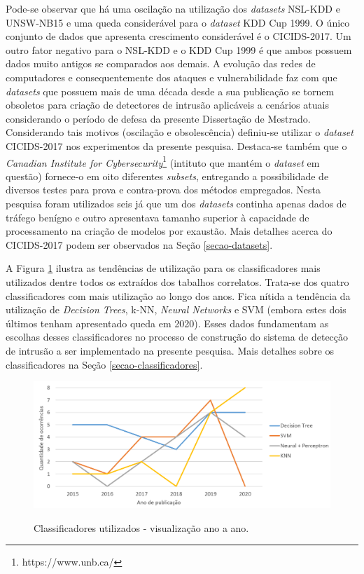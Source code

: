 Pode-se observar que há uma oscilação na utilização dos \textit{datasets} NSL-KDD e UNSW-NB15 e uma queda considerável para o \textit{dataset} KDD Cup 1999. O único conjunto de dados que apresenta crescimento considerável é o CICIDS-2017. Um outro fator negativo para o NSL-KDD e o KDD Cup 1999 é que ambos possuem dados muito antigos se comparados aos demais. A evolução das redes de computadores e consequentemente dos ataques e vulnerabilidade faz com que \textit{datasets} que possuem mais de uma década desde a sua publicação se tornem obsoletos para criação de detectores de intrusão aplicáveis a cenários atuais considerando o período de defesa da presente Dissertação de Mestrado. Considerando tais motivos (oscilação e obsolescência) definiu-se utilizar o \textit{dataset} CICIDS-2017 nos experimentos da presente pesquisa. Destaca-se também que o \textit{Canadian Institute for Cybersecurity}\footnote{https://www.unb.ca/} (intituto que mantém o \textit{dataset} em questão) fornece-o em oito diferentes \textit{subsets}, entregando a possibilidade de diversos testes para prova e contra-prova dos métodos empregados. Nesta pesquisa foram utilizados seis já que um dos \textit{datasets} continha apenas dados de tráfego benígno e outro apresentava tamanho superior à capacidade de processamento na criação de modelos por exaustão. Mais detalhes acerca do CICIDS-2017 podem ser observados na Seção \ref{secao-datasets}.


A Figura \ref{fig:tend_class} ilustra as tendências de utilização para os classificadores mais utilizados dentre todos os extraídos dos tabalhos correlatos. Trata-se dos quatro classificadores com mais utilização ao longo dos anos. Fica nítida a tendência da utilização de \textit{Decision Trees}, k-NN, \textit{Neural Networks} e SVM (embora estes dois últimos tenham apresentado queda em 2020). Esses dados fundamentam as escolhas desses classificadores no processo de construção do sistema de detecção de intrusão a ser implementado na presente pesquisa. Mais detalhes sobre os classificadores na Seção \ref{secao-classificadores}.

\begin{figure}[H]
\centering
\caption{Classificadores utilizados - visualização ano a ano.} \includegraphics[width=\textwidth,keepaspectratio]{figs/tendencias_classificadores.png}
\newline {}\label{fig:tend_class}
\end{figure}

